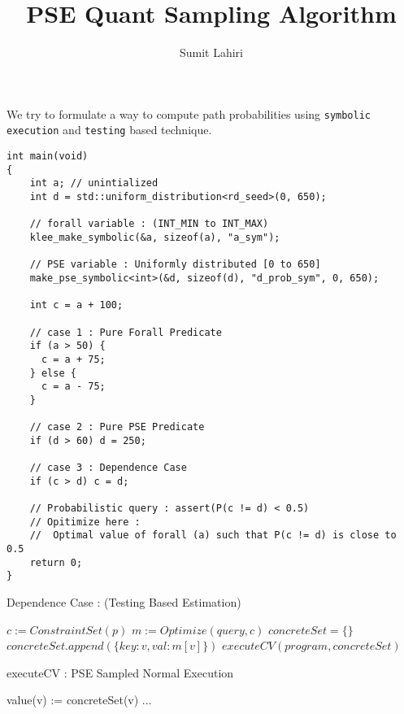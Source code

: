 \documentclass{article}
\title{PSE Quant Sampling Algorithm}
\author{Sumit Lahiri}
\begin{document}
	\maketitle
	
We try to formulate a way to compute path probabilities using \texttt{symbolic execution} and \texttt{testing} based technique.  
\begin{verbatim} 
int main(void)
{
	int a; // unintialized
	int d = std::uniform_distribution<rd_seed>(0, 650);
	
	// forall variable : (INT_MIN to INT_MAX)
	klee_make_symbolic(&a, sizeof(a), "a_sym");
	
	// PSE variable : Uniformly distributed [0 to 650]
	make_pse_symbolic<int>(&d, sizeof(d), "d_prob_sym", 0, 650);
	
	int c = a + 100;
	
	// case 1 : Pure Forall Predicate
	if (a > 50) {
	  c = a + 75;
	} else {
	  c = a - 75;
	}
	
	// case 2 : Pure PSE Predicate
	if (d > 60) d = 250;
	
	// case 3 : Dependence Case
	if (c > d) c = d;

	// Probabilistic query : assert(P(c != d) < 0.5)
	// Opitimize here : 
	//	Optimal value of forall (a) such that P(c != d) is close to 0.5 	
	return 0;
}
\end{verbatim}

\begin{algorithm}[H]
    \caption{Dependence Case : (Testing Based Estimation)}
    \begin{algorithmic}[1]
        \State $c := ConstraintSet(p)$ 
        \State $m := Optimize(query,  c)$ 
        \State $concreteSet = \{ \}$
        	\State $concreteSet.append(\{key : v, val : m[v]\})$ 
        	\EndForEach
        \State $executeCV(program, concreteSet)$
        \EndForEach
    \end{algorithmic}
\end{algorithm}

\begin{algorithm}[H]
	\caption{executeCV : PSE Sampled Normal Execution}
	\begin{algorithmic}[1]
			\State value(v) := concreteSet(v) 
			\EndForEach
			\State ... 
		\EndFunction
	\end{algorithmic}
\end{algorithm}
\end{document}
